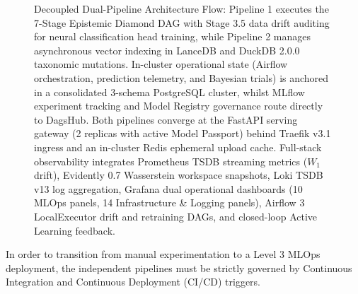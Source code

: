 \begin{figure}[htbp]
{
}
\caption{Decoupled Dual-Pipeline Architecture Flow: Pipeline 1 executes the 7-Stage Epistemic Diamond DAG with Stage 3.5 data drift auditing for neural classification head training, while Pipeline 2 manages asynchronous vector indexing in LanceDB and DuckDB 2.0.0 taxonomic mutations. In-cluster operational state (Airflow orchestration, prediction telemetry, and Bayesian trials) is anchored in a consolidated 3-schema PostgreSQL cluster, whilst MLflow experiment tracking and Model Registry governance route directly to DagsHub. Both pipelines converge at the FastAPI serving gateway (2 replicas with active Model Passport) behind Traefik v3.1 ingress and an in-cluster Redis ephemeral upload cache. Full-stack observability integrates Prometheus TSDB streaming metrics ($W_1$ drift), Evidently 0.7 Wasserstein workspace snapshots, Loki TSDB v13 log aggregation, Grafana dual operational dashboards (10 MLOps panels, 14 Infrastructure \& Logging panels), Airflow 3 LocalExecutor drift and retraining DAGs, and closed-loop Active Learning feedback.}
\label{fig:cicd_flow}
\end{figure}

In order to transition from manual experimentation to a Level 3 MLOps deployment, the independent pipelines must be strictly governed by Continuous Integration and Continuous Deployment (CI/CD) triggers.

